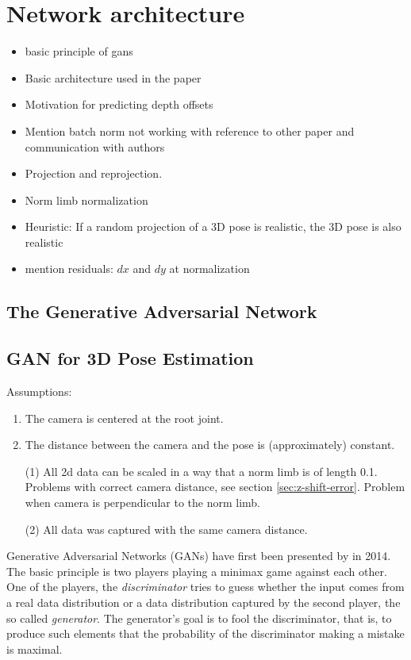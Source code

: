\section{Network architecture}\label{sec:network}
\begin{itemize}
	\item basic principle of gans
	\item Basic architecture used in the paper
	\item Motivation for predicting depth offsets
	\item Mention batch norm not working with reference to other paper and communication with authors
	\item Projection and reprojection.
	\item Norm limb normalization
	\item Heuristic: If a random projection of a 3D pose is realistic, the 3D pose is also realistic
	\item mention residuals: $dx$ and $dy$ at normalization
\end{itemize}

\subsection{The Generative Adversarial Network}

\subsection{GAN for 3D Pose Estimation}

Assumptions:
\begin{enumerate}[label=(\Alph*)]
	\item The camera is centered at the root joint.
	\item The distance between the camera and the pose is (approximately) constant. 
\end{enumerate}
\begin{itemize}
	\item[(1)] All 2d data can be scaled in a way that a norm limb is of length 0.1. 
	Problems with correct camera distance, see section \ref{sec:z-shift-error}. 
	Problem when camera is perpendicular to the norm limb.
	\item[(2)] All data was captured with the same camera distance.
\end{itemize}

Generative Adversarial Networks (GANs) have first been presented by \citet{goodfellow14} in 2014.
The basic principle is two players playing a minimax game against each other.
One of the players, the \textit{discriminator} tries to guess whether the input comes from a real data distribution or a data distribution captured by the second player, the so called \textit{generator}. 
The generator's goal is to fool the discriminator, that is, to produce such elements that the probability of the discriminator making a mistake is maximal.



